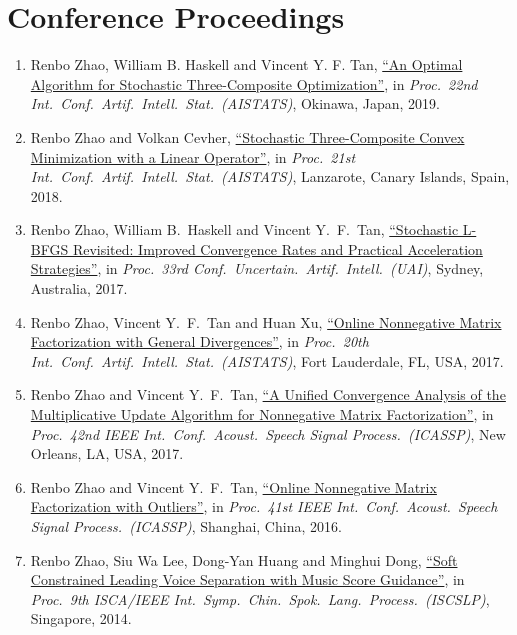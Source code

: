 \documentclass[11pt]{article}
\newcommand{\ICASSP}{IEEE Int.\ Conf.\ Acoust.\ Speech Signal Process.\ (ICASSP)}
\newcommand{\AISTATS}{Int.\ Conf.\ Artif.\ Intell.\ Stat.\ (AISTATS)}
\newcommand{\UAI}{Conf.\ Uncertain.\ Artif.\ Intell.\ (UAI)}
\begin{document}
\section*{\large Conference Proceedings}
\begin{enumerate}[label=C\arabic*.]\setlength{\leftskip}{2ex}
\item {Renbo Zhao}, William B. Haskell and Vincent Y. F. Tan, \href{http://proceedings.mlr.press/v89/zhao19a.html}{``An Optimal Algorithm for Stochastic Three-Composite Optimization''},   in {\em Proc.\ 22nd \AISTATS}, Okinawa, Japan, 2019.%
\item {Renbo Zhao} and Volkan Cevher, \href{http://proceedings.mlr.press/v84/zhao18a.html}{``Stochastic Three-Composite Convex Minimization with a Linear Operator''},  in {\em Proc.\ 21st \AISTATS},  Lanzarote,  Canary Islands, Spain,  2018.  %
\item {Renbo Zhao}, William B.\ Haskell and Vincent Y.\ F.\ Tan, \href{http://auai.org/uai2017/accepted.php}{``Stochastic L-BFGS Revisited: Improved Convergence Rates and Practical Acceleration Strategies''},  in {\em Proc.\ 33rd \UAI}, Sydney, Australia,  2017. %
\item {Renbo Zhao}, Vincent Y.\ F.\ Tan and Huan Xu, \href{http://proceedings.mlr.press/v54/zhao17a.html}{``Online Nonnegative Matrix Factorization with General Divergences''},  in {\em Proc.\ 20th \AISTATS}, Fort Lauderdale, FL, USA, 2017.  
\item {Renbo Zhao} and Vincent Y.\ F.\ Tan, \href{https://ieeexplore.ieee.org/document/7952619}{``A Unified Convergence Analysis of the Multiplicative Update Algorithm for Nonnegative Matrix Factorization''}, in {\em Proc.\ 42nd \ICASSP}, New Orleans, LA, USA,  2017. 
\item {Renbo Zhao} and Vincent Y.\ F.\ Tan, \href{https://ieeexplore.ieee.org/document/7472160}{``Online Nonnegative Matrix Factorization with Outliers''},  in  {\em Proc.\ 41st \ICASSP}, Shanghai, China,  2016. 
\item {Renbo Zhao}, Siu Wa Lee, Dong-Yan Huang and Minghui Dong, \href{https://ieeexplore.ieee.org/document/6936723}{``Soft Constrained Leading Voice Separation with Music Score Guidance''},  in {\em Proc.\ 9th ISCA/IEEE Int.\ Symp.\ Chin.\ Spok.\ Lang.\ Process.\ (ISCSLP)}, Singapore, 2014. %
\end{enumerate}
\end{document}
